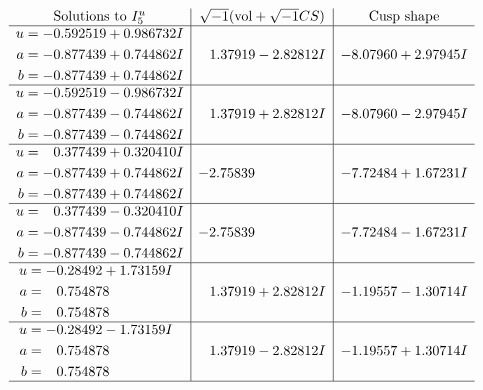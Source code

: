 \documentclass[1p]{elsarticle_modified}
\theoremstyle{definition}
\newcommand{\I}{\sqrt{-1}}
\begin{document}
$$\begin{array}{c|c|c}  
\text{Solutions to }I^u_{5}& \I (\text{vol} + \sqrt{-1}CS) & \text{Cusp shape}\\
 \hline 
\begin{aligned}
u &= -0.592519 + 0.986732 I \\
a &= -0.877439 + 0.744862 I \\
b &= -0.877439 + 0.744862 I\end{aligned}
 & \phantom{-}1.37919 - 2.82812 I & -8.07960 + 2.97945 I \\ \hline\begin{aligned}
u &= -0.592519 - 0.986732 I \\
a &= -0.877439 - 0.744862 I \\
b &= -0.877439 - 0.744862 I\end{aligned}
 & \phantom{-}1.37919 + 2.82812 I & -8.07960 - 2.97945 I \\ \hline\begin{aligned}
u &= \phantom{-}0.377439 + 0.320410 I \\
a &= -0.877439 + 0.744862 I \\
b &= -0.877439 + 0.744862 I\end{aligned}
 & -2.75839\phantom{ +0.000000I} & -7.72484 + 1.67231 I \\ \hline\begin{aligned}
u &= \phantom{-}0.377439 - 0.320410 I \\
a &= -0.877439 - 0.744862 I \\
b &= -0.877439 - 0.744862 I\end{aligned}
 & -2.75839\phantom{ +0.000000I} & -7.72484 - 1.67231 I \\ \hline\begin{aligned}
u &= -0.28492 + 1.73159 I \\
a &= \phantom{-}0.754878\phantom{ +0.000000I} \\
b &= \phantom{-}0.754878\phantom{ +0.000000I}\end{aligned}
 & \phantom{-}1.37919 + 2.82812 I & -1.19557 - 1.30714 I \\ \hline\begin{aligned}
u &= -0.28492 - 1.73159 I \\
a &= \phantom{-}0.754878\phantom{ +0.000000I} \\
b &= \phantom{-}0.754878\phantom{ +0.000000I}\end{aligned}
 & \phantom{-}1.37919 - 2.82812 I & -1.19557 + 1.30714 I\\
 \hline 
 \end{array}$$\newpage\newpage\renewcommand{\arraystretch}{1}
\end{document}
